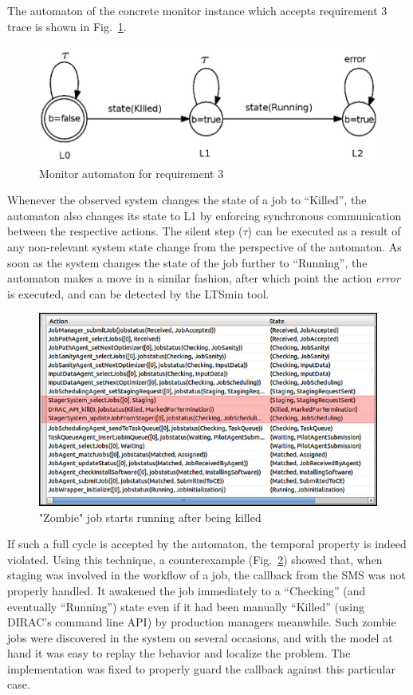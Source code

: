\documentclass[sort&compress,preprint,3p]{elsarticle}
\begin{document}
The automaton of the concrete monitor instance which accepts requirement 3 trace is shown in Fig.~\ref{fig:monitorProcess}. 
\begin{figure}[tp]
\includegraphics[width=0.5\linewidth,keepaspectratio=true]{./Figure10.png}
\centering
\caption{Monitor automaton for requirement 3}
\label{fig:monitorProcess}
\end{figure}%
Whenever the observed system changes the state of a job to ``Killed'', the automaton also changes
its state to L1 by enforcing synchronous communication between the respective actions.
The silent step (${\tau}$) can be executed as a result of any non-relevant system state change
from the perspective of the automaton. As soon as the system changes the state of the job further
to ``Running'', the automaton makes a move in a similar fashion, after which point the action 
\textit{error} is executed, and can be detected by the LTSmin tool. 
\begin{figure}[bp]
\includegraphics[width=0.6\linewidth,keepaspectratio=true]{./Figure11.png}
\centering
\caption{"Zombie" job starts running after being killed}
\label{fig:zombieJob}
\end{figure}%
If such a full cycle is accepted by the automaton, the temporal property is indeed violated.
Using this technique, a counterexample (Fig.~\ref{fig:zombieJob}) showed that, when 
staging was involved in the workflow of a job, the callback from
the SMS was not properly handled.
It awakened the job immediately to a ``Checking'' (and eventually ``Running'') state
even if it had been manually ``Killed'' 
(using DIRAC's command line API) by production managers meanwhile. Such zombie jobs
were discovered in the system on several occasions,
and with the model at hand it was easy to replay the behavior and localize the
problem. The implementation was fixed to properly guard the callback against this particular case.
\end{document}
